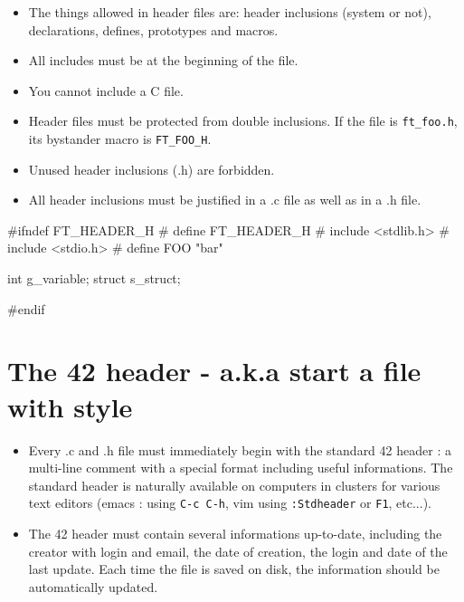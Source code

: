 \documentclass{42-en}
\begin{document}
        \begin{itemize}

            \item The things allowed in header files are:
                header inclusions (system or not), declarations, defines,
                prototypes and macros.

            \item All includes must be at the beginning of the file.

            \item You cannot include a C file.

            \item Header files must be protected from double inclusions. If the file is
            \texttt{ft\_foo.h}, its bystander macro is \texttt{FT\_FOO\_H}.

            \item Unused header inclusions (.h) are forbidden.

            \item All header inclusions must be justified in a .c file
                as well as in a .h file.

        \end{itemize}

        \begin{42ccode}
#ifndef FT_HEADER_H
# define FT_HEADER_H
# include <stdlib.h>
# include <stdio.h>
# define FOO "bar"

int		g_variable;
struct	s_struct;

#endif
        \end{42ccode}
        \newpage



   \section{The 42 header - a.k.a start a file with style}

        \begin{itemize}

        \item Every .c and .h file must immediately begin with the standard 42 header :
          a multi-line comment with a special format including useful informations. The
          standard header is naturally available on computers in clusters for various
          text editors (emacs : using \texttt{C-c C-h}, vim using \texttt{:Stdheader} or
          \texttt{F1}, etc...).

        \item The 42 header must contain several informations up-to-date, including the
          creator with login and email, the date of creation, the login and date of the
          last update. Each time the file is saved on disk, the information should be
          automatically updated.

        \end{itemize}
        \newpage
\end{document}
